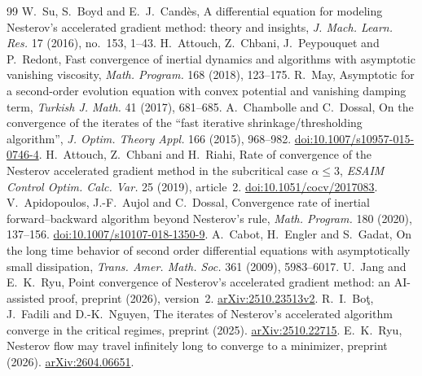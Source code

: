 \documentclass[11pt]{article}
\numberwithin{equation}{section}
\theoremstyle{definition}
\theoremstyle{remark}
\begin{document}
\begin{thebibliography}{99}
 W.~Su, S.~Boyd and E.~J.~Cand\`es, A differential equation for modeling Nesterov's accelerated gradient method: theory and insights, \emph{J. Mach. Learn. Res.} 17 (2016), no.~153, 1--43.
 H.~Attouch, Z.~Chbani, J.~Peypouquet and P.~Redont, Fast convergence of inertial dynamics and algorithms with asymptotic vanishing viscosity, \emph{Math. Program.} 168 (2018), 123--175.
 R.~May, Asymptotic for a second-order evolution equation with convex potential and vanishing damping term, \emph{Turkish J. Math.} 41 (2017), 681--685.
 A.~Chambolle and C.~Dossal, On the convergence of the iterates of the ``fast iterative shrinkage/thresholding algorithm'', \emph{J. Optim. Theory Appl.} 166 (2015), 968--982. \href{https://doi.org/10.1007/s10957-015-0746-4}{doi:10.1007/s10957-015-0746-4}.
 H.~Attouch, Z.~Chbani and H.~Riahi, Rate of convergence of the Nesterov accelerated gradient method in the subcritical case $\alpha\le3$, \emph{ESAIM Control Optim. Calc. Var.} 25 (2019), article~2. \href{https://doi.org/10.1051/cocv/2017083}{doi:10.1051/cocv/2017083}.
 V.~Apidopoulos, J.-F.~Aujol and C.~Dossal, Convergence rate of inertial forward--backward algorithm beyond Nesterov's rule, \emph{Math. Program.} 180 (2020), 137--156. \href{https://doi.org/10.1007/s10107-018-1350-9}{doi:10.1007/s10107-018-1350-9}.
 A.~Cabot, H.~Engler and S.~Gadat, On the long time behavior of second order differential equations with asymptotically small dissipation, \emph{Trans. Amer. Math. Soc.} 361 (2009), 5983--6017.
 U.~Jang and E.~K.~Ryu, Point convergence of Nesterov's accelerated gradient method: an AI-assisted proof, preprint (2026), version~2. \href{https://arxiv.org/abs/2510.23513v2}{arXiv:2510.23513v2}.
 R.~I.~Bo\c{t}, J.~Fadili and D.-K.~Nguyen, The iterates of Nesterov's accelerated algorithm converge in the critical regimes, preprint (2025). \href{https://arxiv.org/abs/2510.22715}{arXiv:2510.22715}.
 E.~K.~Ryu, Nesterov flow may travel infinitely long to converge to a minimizer, preprint (2026). \href{https://arxiv.org/abs/2604.06651}{arXiv:2604.06651}.
\end{thebibliography}
\end{document}
